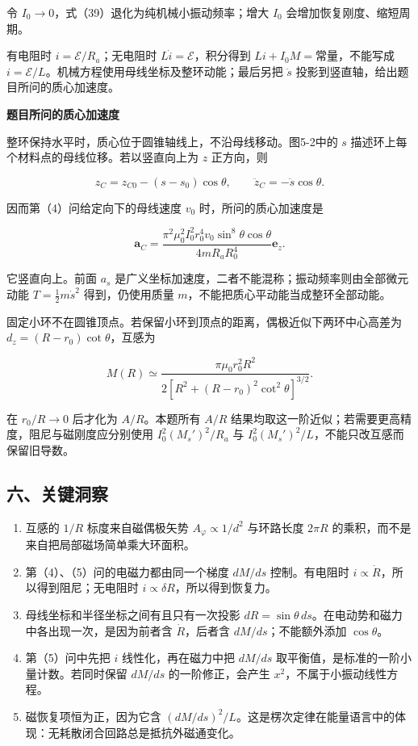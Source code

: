 \documentclass[12pt,a4paper,UTF8]{ctexart}
\newcommand{\tightlist}{\setlength{\itemsep}{0pt}\setlength{\parskip}{0pt}}
\begin{document}
令 \(I_0\to0\)，式（39）退化为纯机械小振动频率；增大 \(I_0\)
会增加恢复刚度、缩短周期。

有电阻时 \(i=\mathcal E/R_a\)；无电阻时 \(L\dot i=\mathcal E\)，积分得到
\(Li+I_0M=\text{常量}\)，不能写成
\(i=\mathcal E/L\)。机械方程使用母线坐标及整环动能；最后另把 \(\ddot s\)
投影到竖直轴，给出题目所问的质心加速度。

\textbf{题目所问的质心加速度}

整环保持水平时，质心位于圆锥轴线上，不沿母线移动。图5-2中的 \(s\)
描述环上每个材料点的母线位移。若以竖直向上为 \(z\) 正方向，则

\[z_C=z_{C0}-(s-s_0)\cos\theta,\qquad
\ddot z_C=-\ddot s\cos\theta.\]

因而第（4）问给定向下的母线速度 \(v_0\) 时，所问的质心加速度是

\[\boxed{\bm a_C=
\frac{\pi^2\mu_0^2I_0^2r_0^4v_0\sin^8\theta\cos\theta}
{4mR_aR_0^4}\bm e_z.}\]

它竖直向上。前面 \(a_s\)
是广义坐标加速度，二者不能混称；振动频率则由全部微元动能
\(T=\tfrac12m\dot s^2\) 得到，仍使用质量
\(m\)，不能把质心平动能当成整环全部动能。

固定小环不在圆锥顶点。若保留小环到顶点的距离，偶极近似下两环中心高差为
\(d_z=(R-r_0)\cot\theta\)，互感为

\[M(R)\simeq\frac{\pi\mu_0r_0^2R^2}
{2[R^2+(R-r_0)^2\cot^2\theta]^{3/2}}.\]

在 \(r_0/R\to0\) 后才化为 \(A/R\)。本题所有 \(A/R\)
结果均取这一阶近似；若需要更高精度，阻尼与磁刚度应分别使用
\(I_0^2(M_s')^2/R_a\) 与 \(I_0^2(M_s')^2/L\)，不能只改互感而保留旧导数。

\subsection{六、关键洞察}\label{ux516dux5173ux952eux6d1eux5bdf-4}

\begin{enumerate}
\def\labelenumi{\arabic{enumi}.}
\tightlist
\item
  互感的 \(1/R\) 标度来自磁偶极矢势 \(A_\varphi\propto1/d^2\) 与环路长度
  \(2\pi R\) 的乘积，而不是来自把局部磁场简单乘大环面积。
\item
  第（4）、（5）问的电磁力都由同一个梯度 \(dM/ds\) 控制。有电阻时
  \(i\propto\dot R\)，所以得到阻尼；无电阻时
  \(i\propto\delta R\)，所以得到恢复力。
\item
  母线坐标和半径坐标之间有且只有一次投影
  \(dR=\sin\theta\,ds\)。在电动势和磁力中各出现一次，是因为前者含
  \(\dot R\)，后者含 \(dM/ds\)；不能额外添加 \(\cos\theta\)。
\item
  第（5）问中先把 \(i\) 线性化，再在磁力中把 \(dM/ds\)
  取平衡值，是标准的一阶小量计数。若同时保留 \(dM/ds\)
  的一阶修正，会产生 \(x^2\)，不属于小振动线性方程。
\item
  磁恢复项恒为正，因为它含
  \((dM/ds)^2/L\)。这是楞次定律在能量语言中的体现：无耗散闭合回路总是抵抗外磁通变化。
\end{enumerate}
\end{document}
